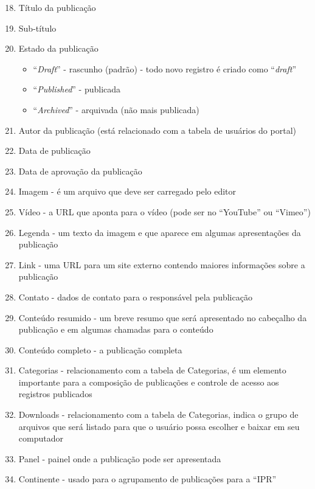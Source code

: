 \begin{enumerate}
    \setcounter{enumi}{17}
    \item Título da publicação
    \item Sub-título
    \item Estado da publicação
        \begin{itemize}
            \item ``\textit{Draft}'' - rascunho (padrão) - todo novo registro é criado como ``\textit{draft}''
            \item ``\textit{Published}'' - publicada
            \item ``\textit{Archived}'' - arquivada (não mais publicada)
        \end{itemize}
    \item Autor da publicação (está relacionado com a tabela de usuários do portal)
    \item Data de publicação
    \item Data de aprovação da publicação
    \item Imagem - é um arquivo que deve ser carregado pelo editor
    \item Vídeo - a \gls{URL} que aponta para o vídeo (pode ser no ``YouTube'' ou ``Vimeo'')
    \item Legenda - um texto da imagem e que aparece em algumas apresentações da publicação
    \item Link - uma \gls{URL} para um site externo contendo maiores informações sobre a publicação
    \item Contato - dados de contato para o responsável pela publicação
    \setcounter{enumi}{32}
    \item Conteúdo resumido - um breve resumo que será apresentado no cabeçalho da publicação e em algumas chamadas para o conteúdo
    \item Conteúdo completo - a publicação completa
    \setcounter{enumi}{35}
    \item Categorias - relacionamento com a tabela de Categorias, é um elemento importante para a composição de publicações e controle de acesso aos registros publicados
    \item Downloads - relacionamento com a tabela de Categorias, indica o grupo de arquivos que será listado para que o usuário possa escolher e baixar em seu computador
    \item Panel - painel onde a publicação pode ser apresentada
    \item Continente - usado para o agrupamento de publicações para a ``IPR''

\end{enumerate}
